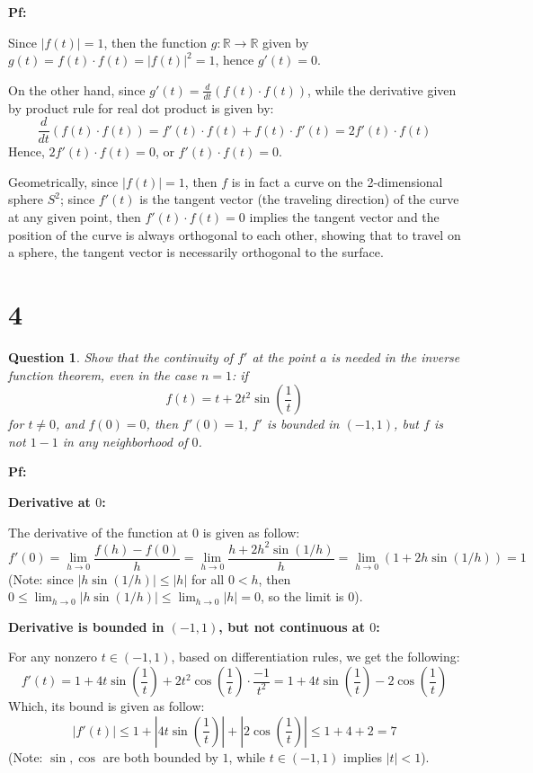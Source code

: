 \documentclass{article}
\newtheorem{question}{Question}
\begin{document}
\textbf{Pf:}

Since $|f(t)|=1$, then the function $g:\mathbb{R}\rightarrow\mathbb{R}$ given by $g(t)=f(t)\cdot f(t)=|f(t)|^2 = 1$, hence $g'(t)=0$.

On the other hand, since $g'(t) = \frac{d}{dt}(f(t)\cdot f(t))$, while the derivative given by product rule for real dot product is given by:
$$\frac{d}{dt}(f(t)\cdot f(t)) = f'(t)\cdot f(t) + f(t)\cdot f'(t) = 2f'(t)\cdot f(t)$$
Hence, $2f'(t)\cdot f(t)=0$, or $f'(t)\cdot f(t)=0$.

Geometrically, since $|f(t)|=1$, then $f$ is in fact a curve on the 2-dimensional sphere $S^2$; since $f'(t)$ is the tangent vector (the traveling direction) of the curve at any given point,
then $f'(t)\cdot f(t)=0$ implies the tangent vector and the position of the curve is always orthogonal to each other, showing that to travel on a sphere, the tangent vector is necessarily orthogonal to the surface.

\hfil

\hfil

\section*{4}
\begin{myBox}[]{}
    \begin{question}
        Show that the continuity of $f'$ at the point $a$ is needed in the inverse function theorem, even in the case $n=1$: if
        $$f(t)=t+2t^2\sin\left(\frac{1}{t}\right)$$
        for $t\neq 0$, and $f(0)=0$, then $f'(0)=1$, $f'$ is bounded in $(-1,1)$, but $f$ is not $1-1$ in any neighborhood of $0$.
    \end{question}
\end{myBox}

\textbf{Pf:}

\textbf{Derivative at $0$:}

The derivative of the function at $0$ is given as follow:
$$f'(0)=\lim_{h\rightarrow 0}\frac{f(h)-f(0)}{h}=\lim_{h\rightarrow 0}\frac{h+2h^2\sin(1/h)}{h}=\lim_{h\rightarrow 0}(1+2h\sin(1/h))=1$$
(Note: since $|h\sin(1/h)|\leq |h|$ for all $0<h$, then $0\leq \lim_{h\rightarrow 0}|h\sin(1/h)|\leq \lim_{h\rightarrow 0}|h|=0$, so the limit is $0$).

\hfil

\textbf{Derivative is bounded in $(-1,1)$, but not continuous at $0$:}

For any nonzero $t\in (-1,1)$, based on differentiation rules, we get the following:
$$f'(t)=1+4t\sin\left(\frac{1}{t}\right) + 2t^2\cos\left(\frac{1}{t}\right)\cdot\frac{-1}{t^2} = 1+4t\sin\left(\frac{1}{t}\right)-2\cos\left(\frac{1}{t}\right)$$
Which, its bound is given as follow:
$$|f'(t)| \leq 1+\left|4t\sin\left(\frac{1}{t}\right)\right| + \left|2\cos\left(\frac{1}{t}\right)\right| \leq 1+4+2 = 7$$
(Note: $\sin,\cos$ are both bounded by $1$, while $t\in (-1,1)$ implies $|t|<1$).
\end{document}
